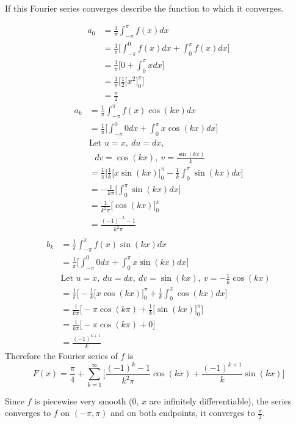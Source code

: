 \documentclass{article}
\begin{document}
\begin{enumerate}
\begin{enumerate}
If this Fourier series converges describe the function to which it converges.
        \begin{multicols}{2}
        \noindent
        \begin{align*}
            a_0 &= \frac{1}{\pi} \int_{-\pi}^{\pi}f(x) dx \\
            &= \frac{1}{\pi} \Bigg[\int_{-\pi}^{0}f(x) dx + \int_{0}^{\pi}f(x) dx \Bigg] \\
            &= \frac{1}{\pi} \Bigg[ 0 + \int_{0}^{\pi}x dx \Bigg] \\
            &= \frac{1}{\pi} \Bigg[\frac{1}{2}\Big[x^2\Big]_{0}^{\pi} \Bigg] \\
            &= \frac{\pi}{2}
        \end{align*}
        \begin{align*}
            a_k &= \frac{1}{\pi} \int_{-\pi}^{\pi}f(x)\cos(kx) dx \\
            &= \frac{1}{\pi} \Bigg[\int_{-\pi}^{0}0 dx + \int_{0}^{\pi}x\cos(kx) dx\Bigg] \\
            &\text{Let } u = x,\: du = dx,  \\
            & \: \: \:dv = \cos(kx),\: v = \frac{\sin(kx)}{k} \\
            &= \frac{1}{\pi} \Bigg[\frac{1}{k}\Big[x\sin(kx)\Big]^{\pi}_{0} - \frac{1}{k}\int_{0}^{\pi}\sin(kx) dx\Bigg] \\
            &= - \frac{1}{k\pi} \Bigg[\int_{0}^{\pi}\sin(kx) dx\Bigg] \\
            &= \frac{1}{k^2\pi} \Big[\cos(kx) \Big]_{0}^{\pi}\\
            &= \frac{(-1)^{-k} - 1}{k^2\pi} \\
        \end{align*}
        \begin{align*}
            b_k &= \frac{1}{\pi} \int_{-\pi}^{\pi}f(x)\sin(kx) dx \\
            &= \frac{1}{\pi} \Bigg[\int_{-\pi}^{0}0 dx +  \int_{0}^{\pi}x\sin(kx) dx \Bigg]\\
            &\text{Let } u = x,\: du = dx,\: dv = \sin(kx),\: v = -\frac{1}{k}\cos(kx) \\
            &= \frac{1}{\pi} \Bigg[-\frac{1}{k}\Big[x\cos(kx)\Big]^{\pi}_{0} + \frac{1}{k}\int_{0}^{\pi}\cos(kx) dx \Bigg]\\
            &= \frac{1}{k \pi} \Bigg[-\pi\cos(k\pi) + \frac{1}{k} \Big[ \sin(kx) \Big]_{0}^{\pi} \Bigg]\\
            &= \frac{1}{k \pi} \Bigg[-\pi\cos(k\pi) + 0 \Bigg]\\
            &= \frac{(-1)^{k+1}}{k}
        \end{align*}
        Therefore the Fourier series of $f$ is 
        \[
        F(x) = \frac{\pi}{4} + \sum^{\infty}_{k=1}\Bigg[ \frac{(-1)^k-1}{k^2\pi}\cos(kx) + \frac{(-1)^{k+1}}{k} \sin(kx) \Bigg]
        \]
        \end{multicols}
        Since $f$ is piecewise very smooth (0, $x$ are infinitely differentiable), the series converges to $f$ on $(-\pi,\pi)$ and on both endpoints, it converges to $\frac{\pi}{2}$.
        

\end{enumerate}
\end{enumerate}
\end{document}
